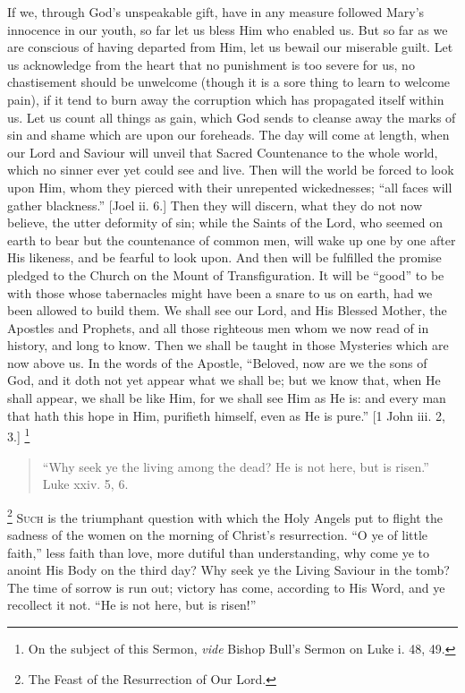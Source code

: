 If we, through God's unspeakable gift, have in any measure followed
Mary's innocence in our youth, so far let us bless Him who enabled us.
But so far as we are conscious of having departed from Him, let us
bewail our miserable guilt. Let us acknowledge from the heart that no
punishment is too severe for us, no chastisement should be unwelcome
(though it is a sore thing to learn to welcome pain), if it tend to burn
away the corruption which has propagated itself within us. Let us count
all things as gain, which God sends to cleanse away the marks of sin and
shame which are upon our foreheads. The day will come at length, when
our Lord and Saviour will unveil that Sacred Countenance to the whole
world, which no sinner ever yet could see and live. Then will the world
be forced to look upon Him, whom they pierced with their unrepented
wickednesses; ``all faces will gather blackness.'' [Joel ii. 6.]
Then they will discern, what they do not now believe, the utter
deformity of sin; while the Saints of the Lord, who seemed on earth to
bear but the countenance of common men, will wake up one by one after
His likeness, and be fearful to look upon. And then will be fulfilled
the promise pledged to the Church on the Mount of Transfiguration. It
will be ``good'' to be with those whose tabernacles might have
been a snare to us on earth, had we been allowed to build them. We shall
see our Lord, and His Blessed Mother, the Apostles and Prophets, and all
those righteous men whom we now read of in history, and long to know.
Then we shall be taught in those Mysteries which are now above us. In
the words of the Apostle, ``Beloved, now are we the sons of God, and
it doth not yet appear what we shall be; but we know that, when He shall
appear, we shall be like Him, for we shall see Him as He is: and every
man that hath this hope in Him, purifieth himself, even as He is
pure.'' [1 John iii. 2, 3.] \footnote{On the subject of this Sermon, \emph{vide}
Bishop Bull's Sermon on Luke i. 48, 49.}


\begin{quote}

``Why seek ye the living among the dead? He is not here, but is
risen.'' Luke xxiv. 5, 6.

\end{quote}

\footnote{The Feast of the Resurrection of Our Lord.} S\textsc{uch} is the triumphant
question with which the Holy Angels put to flight the sadness of the
women on the morning of Christ's resurrection. ``O ye of little
faith,'' less faith than love, more dutiful than understanding, why
come ye to anoint His Body on the third day? Why seek ye the Living
Saviour in the tomb? The time of sorrow is run out; victory has come,
according to His Word, and ye recollect it not. ``He is not here,
but is risen!''


